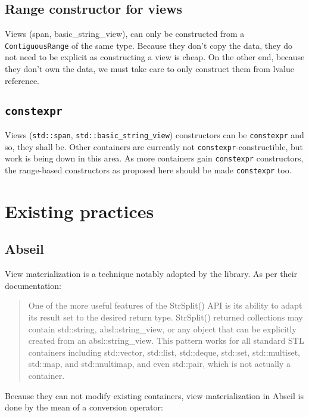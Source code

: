 \documentclass{wg21}
\newcommand{\cc}[1]{\texttt{#1}}
\begin{document}
\subsection{Range constructor for views}

Views (span, basic_string_view), can only be constructed from a \cc{ContiguousRange} of the same type.
Because they don't copy the data, they do not need to be explicit as constructing a view is cheap.
On the other end, because they don't own the data, we must take care to only construct them from lvalue reference.

\subsection{\cc{constexpr}}

Views (\cc{std::span}, \cc{std::basic_string_view}) constructors can be \cc{constexpr} and so, they shall be.
Other containers are currently not \cc{constexpr}-constructible, but work is being down in this area.
As more containers gain \cc{constexpr} constructors, the range-based constructors as proposed here should be made \cc{constexpr} too.

\section{Existing practices}

\subsection{Abseil}

View materialization is a technique notably adopted by the \cite{Abseil} library. As per their documentation:

\begin{quote}
    One of the more useful features of the StrSplit() API is its ability to adapt its result set to the desired return type.
    StrSplit() returned collections may contain std::string, absl::string_view, or any object that can be explicitly created from an absl::string_view.
    This pattern works for all standard STL containers including std::vector,
    std::list, std::deque, std::set, std::multiset, std::map, and std::multimap, and even std::pair, which is not actually a container.
\end{quote}

Because they can not modify existing containers, view materialization in Abseil is done by the mean of a conversion operator:
\end{document}
